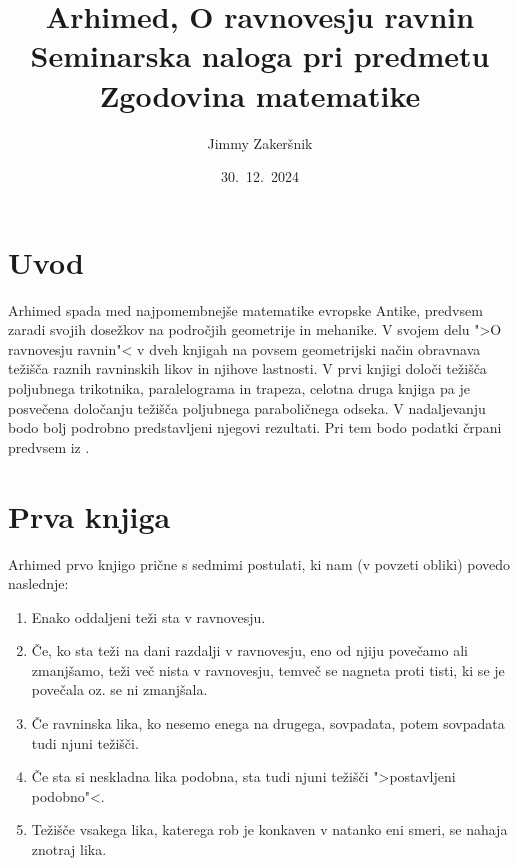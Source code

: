 \documentclass[a4paper, 10pt]{article}
\title{Arhimed, O ravnovesju ravnin\\ {\large Seminarska naloga pri predmetu Zgodovina matematike}}
\date{30.~12.~2024}
\author{Jimmy Zakeršnik}
\begin{document}
	\maketitle
	\thispagestyle{empty}
	\newpage
	\newpage
	\section{Uvod}
		Arhimed spada med najpomembnejše matematike evropske Antike, predvsem zaradi svojih dosežkov na področjih geometrije in mehanike. V svojem delu ">O ravnovesju ravnin"< v dveh knjigah na povsem geometrijski način obravnava težišča raznih ravninskih likov in njihove lastnosti. V prvi knjigi določi težišča poljubnega trikotnika, paralelograma in trapeza, celotna druga knjiga pa je posvečena določanju težišča poljubnega paraboličnega odseka. V nadaljevanju bodo bolj podrobno predstavljeni njegovi rezultati. Pri tem bodo podatki črpani predvsem iz \cite{bib:Heath}.
	\section{Prva knjiga}
		Arhimed prvo knjigo prične s sedmimi postulati, ki nam (v povzeti obliki) povedo naslednje: \begin{enumerate}
			\item Enako oddaljeni teži sta v ravnovesju.
			\item Če, ko sta teži na dani razdalji v ravnovesju, eno od njiju povečamo ali zmanjšamo, teži več nista v ravnovesju, temveč se nagneta proti tisti, ki se je povečala oz. se ni zmanjšala.
			\item Če ravninska lika, ko nesemo enega na drugega, sovpadata, potem sovpadata tudi njuni težišči.
			\item Če sta si neskladna lika podobna, sta tudi njuni težišči ">postavljeni podobno"<. 
			\item Težišče vsakega lika, katerega rob je konkaven v natanko eni smeri, se nahaja znotraj lika.
		\end{enumerate}
		
\end{document}

